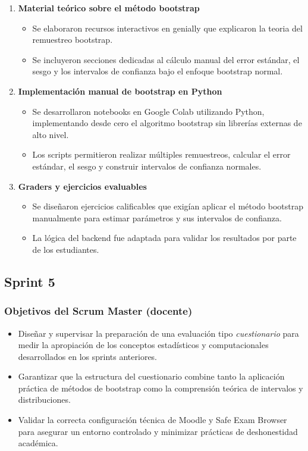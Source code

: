 \documentclass[letter,oneside,12pt,spanish]{report}
\begin{document}
\begin{enumerate}
	\item \textbf{Material teórico sobre el método bootstrap}  
	\begin{itemize}
		\item Se elaboraron recursos interactivos en genially que explicaron la teoria del remuestreo bootstrap.
		\item Se incluyeron secciones dedicadas al cálculo manual del error estándar, el sesgo y los intervalos de confianza bajo el enfoque bootstrap normal.
	\end{itemize}
	
	\item \textbf{Implementación manual de bootstrap en Python}  
	\begin{itemize}
		\item Se desarrollaron notebooks en Google Colab utilizando Python, implementando desde cero el algoritmo bootstrap sin librerías externas de alto nivel.
		\item Los scripts permitieron realizar múltiples remuestreos, calcular el error estándar, el sesgo y construir intervalos de confianza normales.
	\end{itemize}
	
	\item \textbf{Graders y ejercicios evaluables}  
	\begin{itemize}
		\item Se diseñaron ejercicios calificables que exigían aplicar el método bootstrap manualmente para estimar parámetros y sus intervalos de confianza.
		\item La lógica del backend fue adaptada para validar los resultados por parte de los estudiantes.
	\end{itemize}
	
\end{enumerate}

\subsection{Sprint 5}

\subsubsection*{Objetivos del Scrum Master (docente)}
\begin{itemize}
	\item Diseñar y supervisar la preparación de una evaluación tipo \textit{cuestionario} para medir la apropiación de los conceptos estadísticos y computacionales desarrollados en los sprints anteriores.
	\item Garantizar que la estructura del cuestionario combine tanto la aplicación práctica de métodos de bootstrap como la comprensión teórica de intervalos y distribuciones.
	\item Validar la correcta configuración técnica de Moodle y Safe Exam Browser para asegurar un entorno controlado y minimizar prácticas de deshonestidad académica.
\end{itemize}
\end{document}
